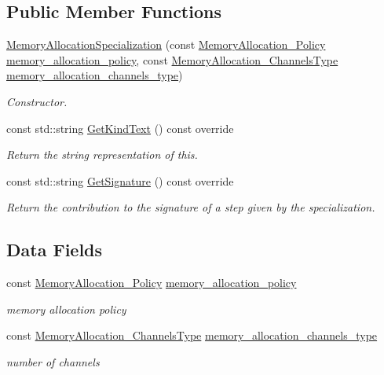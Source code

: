 \subsection*{Public Member Functions}
\begin{DoxyCompactItemize}
\item 
\hyperlink{classMemoryAllocationSpecialization_a63ab1bb8c2d88512769b48ccb90efb8b}{Memory\+Allocation\+Specialization} (const \hyperlink{memory__allocation_8hpp_aad85c6dac5893e8093336373dd19539b}{Memory\+Allocation\+\_\+\+Policy} \hyperlink{classMemoryAllocationSpecialization_a22c638516330fb740737ffb1df4397fb}{memory\+\_\+allocation\+\_\+policy}, const \hyperlink{memory__allocation_8hpp_a84978b137ea64df6a0ffc0cc92cbdd3f}{Memory\+Allocation\+\_\+\+Channels\+Type} \hyperlink{classMemoryAllocationSpecialization_ac77451cff627c7426d5dc33b4c3879dc}{memory\+\_\+allocation\+\_\+channels\+\_\+type})
\begin{DoxyCompactList}\small\item\em Constructor. \end{DoxyCompactList}\item 
const std\+::string \hyperlink{classMemoryAllocationSpecialization_a8c2ddfcb441998e471a3636503979657}{Get\+Kind\+Text} () const override
\begin{DoxyCompactList}\small\item\em Return the string representation of this. \end{DoxyCompactList}\item 
const std\+::string \hyperlink{classMemoryAllocationSpecialization_a539bd1789baf2ecf8db545a3ea80855a}{Get\+Signature} () const override
\begin{DoxyCompactList}\small\item\em Return the contribution to the signature of a step given by the specialization. \end{DoxyCompactList}\end{DoxyCompactItemize}
\subsection*{Data Fields}
\begin{DoxyCompactItemize}
\item 
const \hyperlink{memory__allocation_8hpp_aad85c6dac5893e8093336373dd19539b}{Memory\+Allocation\+\_\+\+Policy} \hyperlink{classMemoryAllocationSpecialization_a22c638516330fb740737ffb1df4397fb}{memory\+\_\+allocation\+\_\+policy}
\begin{DoxyCompactList}\small\item\em memory allocation policy \end{DoxyCompactList}\item 
const \hyperlink{memory__allocation_8hpp_a84978b137ea64df6a0ffc0cc92cbdd3f}{Memory\+Allocation\+\_\+\+Channels\+Type} \hyperlink{classMemoryAllocationSpecialization_ac77451cff627c7426d5dc33b4c3879dc}{memory\+\_\+allocation\+\_\+channels\+\_\+type}
\begin{DoxyCompactList}\small\item\em number of channels \end{DoxyCompactList}\end{DoxyCompactItemize}


